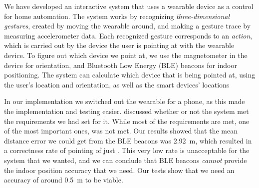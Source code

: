 We have developed an interactive system that uses a wearable device as a control for home automation. 
The system works by recognizing \emph{three-dimensional gestures}, 
created by moving the wearable around, 
and making a gesture trace by measuring accelerometer data. 
Each recognized gesture corresponds to an \emph{action}, 
which is carried out by the device the user is pointing at with the wearable device. 
To figure out which device we point at, 
we use the magnetometer in the device for orientation, 
and Bluetooth Low Energy (BLE) beacons for indoor positioning. 
The system can calculate which device that is being pointed at, 
using the user's location and orientation, 
as well as the smart devices' locations 

In our implementation we switched out the wearable for a phone, 
as this made the implementation and testing easier. 
 discussed whether or not the system met the requirements we had set for it. 
While most of the requirements are met, 
one of the most important ones,
was not met. 
Our results showed that the mean distance error we could get from the BLE beacons was \SI{2.92}{\meter},
which resulted in a correctness rate of pointing of just . 
This very low rate is unacceptable for the system that we wanted, 
and we can conclude that BLE beacons \emph{cannot} provide the indoor position accuracy that we need. 
Our tests show that we need an accuracy of around \SI{0.5}{\meter} to be viable. 

